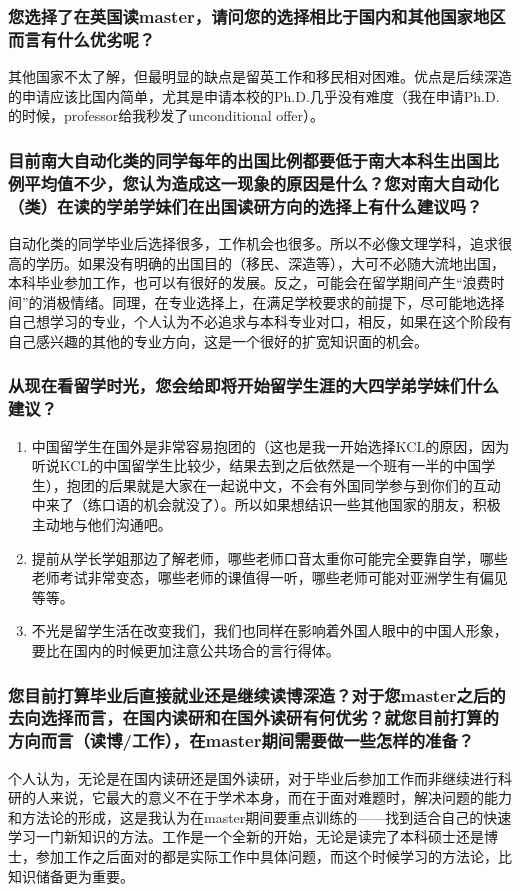 \documentclass[a4paper,UTF8]{book}
\begin{document}
    \subsubsection*{您选择了在英国读master，请问您的选择相比于国内和其他国家地区而言有什么优劣呢？}
    其他国家不太了解，但最明显的缺点是留英工作和移民相对困难。优点是后续深造的申请应该比国内简单，尤其是申请本校的Ph.D.几乎没有难度（我在申请Ph.D.的时候，professor给我秒发了unconditional offer）。

    \subsubsection*{目前南大自动化类的同学每年的出国比例都要低于南大本科生出国比例平均值不少，您认为造成这一现象的原因是什么？您对南大自动化（类）在读的学弟学妹们在出国读研方向的选择上有什么建议吗？}
    自动化类的同学毕业后选择很多，工作机会也很多。所以不必像文理学科，追求很高的学历。如果没有明确的出国目的（移民、深造等），大可不必随大流地出国，本科毕业参加工作，也可以有很好的发展。反之，可能会在留学期间产生“浪费时间”的消极情绪。同理，在专业选择上，在满足学校要求的前提下，尽可能地选择自己想学习的专业，个人认为不必追求与本科专业对口，相反，如果在这个阶段有自己感兴趣的其他的专业方向，这是一个很好的扩宽知识面的机会。
    \subsubsection*{从现在看留学时光，您会给即将开始留学生涯的大四学弟学妹们什么建议？}
        \begin{enumerate}[itemindent=0pt,itemsep=0pt,parsep=0pt]
            \item 中国留学生在国外是非常容易抱团的（这也是我一开始选择KCL的原因，因为听说KCL的中国留学生比较少，结果去到之后依然是一个班有一半的中国学生），抱团的后果就是大家在一起说中文，不会有外国同学参与到你们的互动中来了（练口语的机会就没了）。所以如果想结识一些其他国家的朋友，积极主动地与他们沟通吧。
            \item 提前从学长学姐那边了解老师，哪些老师口音太重你可能完全要靠自学，哪些老师考试非常变态，哪些老师的课值得一听，哪些老师可能对亚洲学生有偏见等等。
            \item 不光是留学生活在改变我们，我们也同样在影响着外国人眼中的中国人形象，要比在国内的时候更加注意公共场合的言行得体。
        \end{enumerate}
        
    \subsubsection*{您目前打算毕业后直接就业还是继续读博深造？对于您master之后的去向选择而言，在国内读研和在国外读研有何优劣？就您目前打算的方向而言（读博/工作），在master期间需要做一些怎样的准备？}
    个人认为，无论是在国内读研还是国外读研，对于毕业后参加工作而非继续进行科研的人来说，它最大的意义不在于学术本身，而在于面对难题时，解决问题的能力和方法论的形成，这是我认为在master期间要重点训练的——找到适合自己的快速学习一门新知识的方法。工作是一个全新的开始，无论是读完了本科硕士还是博士，参加工作之后面对的都是实际工作中具体问题，而这个时候学习的方法论，比知识储备更为重要。   
\end{document}
